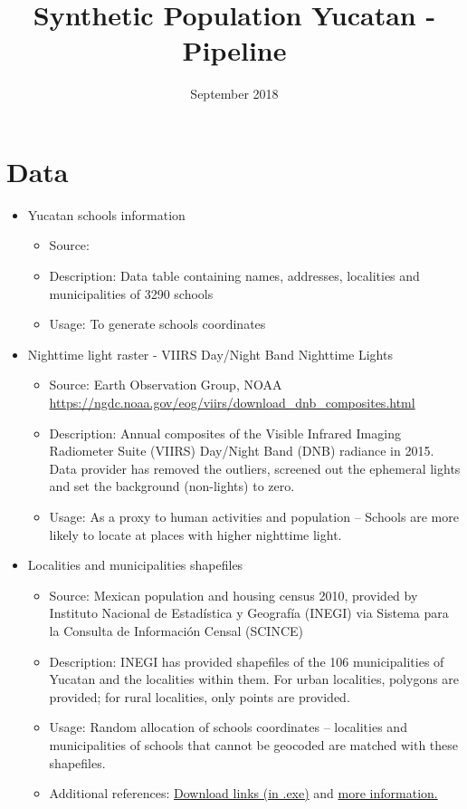 \documentclass{article}
\title{Synthetic Population Yucatan - Pipeline}
\author{}
\date{September 2018}
\begin{document}
\section{Data}
\begin{itemize}
\item Yucatan schools information
    \begin{itemize}
        \item Source:
        \item Description: Data table containing names, addresses, localities and municipalities of 3290
        schools
        \item Usage: To generate schools coordinates
    \end{itemize}
\item Nighttime light raster - VIIRS Day/Night Band Nighttime Lights
    \begin{itemize}
        \item Source: Earth Observation Group, NOAA \url{https://ngdc.noaa.gov/eog/viirs/download_dnb_composites.html}
        \item Description: Annual composites of the Visible Infrared Imaging Radiometer Suite (VIIRS) Day/Night Band (DNB) radiance in 2015. Data provider has removed the outliers, screened out the ephemeral lights and set the background (non-lights) to zero.
        \item Usage: As a proxy to human activities and population -- Schools are more likely to locate at places with higher nighttime light. 
    \end{itemize}
\item Localities and municipalities shapefiles
    \begin{itemize}
        \item Source: Mexican population and housing census 2010, provided by Instituto Nacional de Estadística y Geografía (INEGI) via Sistema para la Consulta de Información Censal (SCINCE)
        \item Description: INEGI has provided shapefiles of the 106 municipalities of Yucatan and the localities within them. For urban localities, polygons are provided; for rural localities, only points are provided.
        \item Usage: Random allocation of schools coordinates -- localities and municipalities of schools that cannot be geocoded are matched with these shapefiles.
        \item Additional references:  \href{http://www.inegi.org.mx/est/scince/scince2010.aspx?_file=/est/scince/scince2010/Scince2010_31.exe&idusr=80085%22%20-o%20yuc_scince.exe} {Download links (in .exe)}
        and \href{https://blog.diegovalle.net/2013/06/shapefiles-of-mexico-agebs-manzanas-etc.html}{more information.}
    \end{itemize}
\end{itemize}
\end{document}
